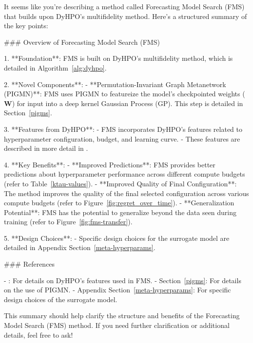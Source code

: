It seems like you're describing a method called Forecasting Model Search (FMS) that builds upon DyHPO's multifidelity method. Here’s a structured summary of the key points:

### Overview of Forecasting Model Search (FMS)

1. **Foundation**: FMS is built on DyHPO's multifidelity method, which is detailed in Algorithm~\ref{alg:dyhpo}.
   
2. **Novel Components**:
   - **Permutation-Invariant Graph Metanetwork (PIGMN)**: FMS uses PIGMN to featureize the model's checkpointed weights (\(\mathbf{W}\)) for input into a deep kernel Gaussian Process (GP). This step is detailed in Section~\ref{pigms}.

3. **Features from DyHPO**:
   - FMS incorporates DyHPO's features related to hyperparameter configuration, budget, and learning curve.
   - These features are described in more detail in \cite{wistuba2023supervising}.

4. **Key Benefits**:
   - **Improved Predictions**: FMS provides better predictions about hyperparameter performance across different compute budgets (refer to Table~\ref{ktau-values}).
   - **Improved Quality of Final Configuration**: The method improves the quality of the final selected configuration across various compute budgets (refer to Figure~\ref{fig:regret_over_time}).
   - **Generalization Potential**: FMS has the potential to generalize beyond the data seen during training (refer to Figure~\ref{fig:fms-transfer}).

5. **Design Choices**:
   - Specific design choices for the surrogate model are detailed in Appendix Section~\ref{meta-hyperparams}.

### References

- \cite{wistuba2023supervising}: For details on DyHPO's features used in FMS.
- Section~\ref{pigms}: For details on the use of PIGMN.
- Appendix Section~\ref{meta-hyperparams}: For specific design choices of the surrogate model.

This summary should help clarify the structure and benefits of the Forecasting Model Search (FMS) method. If you need further clarification or additional details, feel free to ask!
